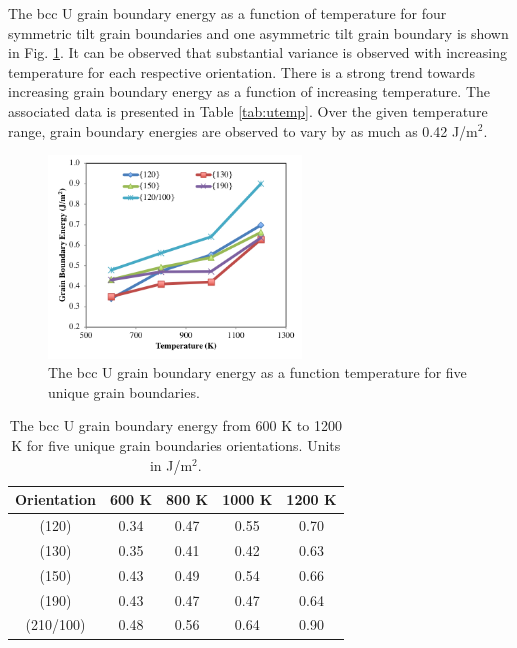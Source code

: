 \documentclass[review]{elsarticle}
\begin{document}
\FloatBarrier

The bcc U grain boundary energy as a function of temperature for four symmetric tilt grain boundaries and one asymmetric tilt grain boundary is shown in Fig. \ref{fig:utemp}. It can be observed that substantial variance is observed with increasing temperature for each respective orientation. There is a strong trend towards increasing grain boundary energy as a function of increasing temperature. The associated data is presented in Table \ref{tab:utemp}. Over the given temperature range, grain boundary energies are observed to vary by as much as 0.42 J/m$^{2}$. 

\begin{figure}[h]
 \centering
 \includegraphics[width=0.6\textwidth]{u_temp.png} 
 \caption{The bcc U grain boundary energy as a function temperature for five unique grain boundaries.}
 \label{fig:utemp}
\end{figure}

\FloatBarrier

\begin{table}[h]
\caption{The bcc U grain boundary energy from 600 K to 1200 K for five unique grain boundaries orientations. Units in J/m$^{2}$. } \label{tab:utemp}
\begin{center}
\begin{tabular}{|c|c|c|c|c|}
	\hline
	Orientation & 600 K & 800 K & 1000 K & 1200 K \\
	 \hline
	 (120) & 0.34 & 0.47 & 0.55 & 0.70 \\
	 (130) & 0.35 & 0.41 & 0.42 & 0.63 \\
	 (150) & 0.43 & 0.49 & 0.54 & 0.66 \\
	 (190) & 0.43 & 0.47 & 0.47 & 0.64 \\
	 (210/100) & 0.48 & 0.56 & 0.64 & 0.90 \\	 
	 \hline
\end{tabular}
\end{center}
\label{default}
\end{table}
\end{document}
